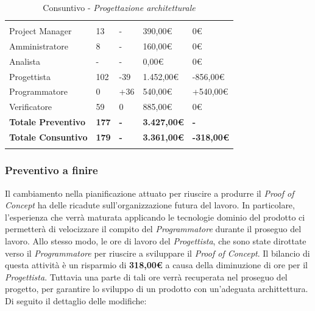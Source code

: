 \begin{table}[H]
	\centering
	\begin{tabular}{|p{3.8cm}|C{2.6cm}|C{2.9cm}|C{2.7cm}|C{3.3cm}|}
		
		 & & & & \\
		Project Manager  & 13 & - & 390,00\euro & 0\euro \\
		\hline
		Amministratore& 8 & - & 160,00\euro & 0\euro \\
		\hline
		Analista      & - & - & 0,00\euro & 0\euro \\
		\hline
		Progettista   & 102  & -39 & 1.452,00\euro & -856,00\euro \\
		\hline
		Programmatore & 0  & +36 & 540,00\euro & +540,00\euro \\
		\hline
		Verificatore  & 59 & 0 & 885,00\euro & 0\euro \\
		\textbf{Totale Preventivo} & \textbf{177} & \textbf{-} & \textbf{3.427,00\euro} & \textbf{-}\\
		\textbf{Totale Consuntivo} & \textbf{179} & \textbf{-} & \textbf{3.361,00\euro} & \textbf{-318,00\euro}\\
	\end{tabular}
	\caption{Consuntivo - \textit{Progettazione architetturale}}
	
\end{table}

\subsubsection{Preventivo a finire}
Il cambiamento nella pianificazione attuato per riuscire a produrre il \textit{Proof of Concept} ha delle ricadute sull'organizzazione futura del lavoro. In particolare, l'esperienza che verrà maturata applicando le tecnologie dominio del prodotto ci permetterà di velocizzare il compito del \textit{Programmatore} durante il proseguo del lavoro. Allo stesso modo, le ore di lavoro del \textit{Progettista}, che sono state dirottate verso il \textit{Programmatore} per riuscire a sviluppare il \textit{Proof of Concept}. Il bilancio di questa attività è un risparmio di \textbf{318,00\euro} a causa della diminuzione di ore per il \textit{Progettista}. Tuttavia una parte di tali ore verrà recuperata nel proseguo del progetto, per garantire lo sviluppo di un prodotto con un'adeguata archittettura.
Di seguito il dettaglio delle modifiche:


